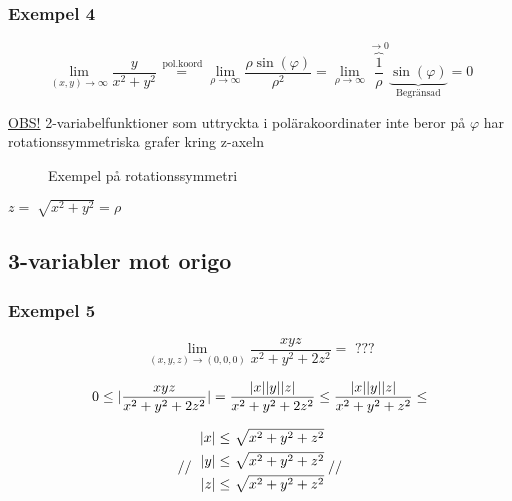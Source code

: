 \documentclass[a4paper]{article}
\DeclarePairedDelimiter \abs{\lvert}{\rvert}
\let\oldsqrt\sqrt
\renewcommand*{\sqrt}[2][\ ]{\oldsqrt[#1]{#2} }
\begin{document}
\newpage
\subsubsection{Exempel 4}

\begin{equation} \label{eq:2.4}
	\lim_{(x,y) \rightarrow \infty} \frac{y}{x^2+y^2} \overset{\,\mathrm{pol.koord}}{=} \lim_{\rho \rightarrow \infty} \frac{\rho \sin(\varphi)}{\rho^2} = 
	\lim_{\rho \rightarrow \infty} \overbrace{\frac{1}{\rho}}^{\rightarrow 0} \underbrace{\sin(\varphi)}_\text{Begränsad} = 0
\end{equation}

\underline{OBS!} 2-variabelfunktioner som uttryckta i polärakoordinater inte beror på $\varphi$ har rotationssymmetriska grafer kring z-axeln

\begin{figure}[ht]
\usetikzlibrary{3d}
\caption{Exempel på rotationssymmetri} \label{fig:2.3}
\end{figure}

\(
z = \sqrt{x^2+y^2} = \rho
\)

\subsection{3-variabler mot origo}
\subsubsection{Exempel 5} 

\begin{equation} \label{eq:2.5}
	\lim_{(x,y,z) \rightarrow (0,0,0)} \frac{xyz}{x^2+y^2+2z^2} = \text{ ???}
\end{equation}

\[
	0 \leq \abs{\frac{xyz}{x^2+y^2+2z^2}} = \frac{\abs{x}\abs{y}\abs{z}}{x^2+y^2+2z^2} \leq \frac{\abs{x}\abs{y}\abs{z}}{x^2+y^2+z^2} \leq 
\]

\[
	// 
	\def\arraystretch{1.1}
	\begin{blockarray}{r@{\;}l}
	\abs{x} \leq \sqrt{x^2+y^2+z^2} \\ [\jot]
	\abs{y} \leq \sqrt{x^2+y^2+z^2} \\ [\jot]
	\abs{z} \leq \sqrt{x^2+y^2+z^2}
	\end{blockarray}
	//
\]
\end{document}
